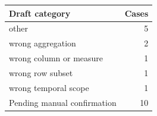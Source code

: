 \begin{tabular}{lr}
\toprule
Draft category & Cases \\
\midrule
other & 5 \\
wrong aggregation & 2 \\
wrong column or measure & 1 \\
wrong row subset & 1 \\
wrong temporal scope & 1 \\
\midrule
Pending manual confirmation & 10 \\
\bottomrule
\end{tabular}
